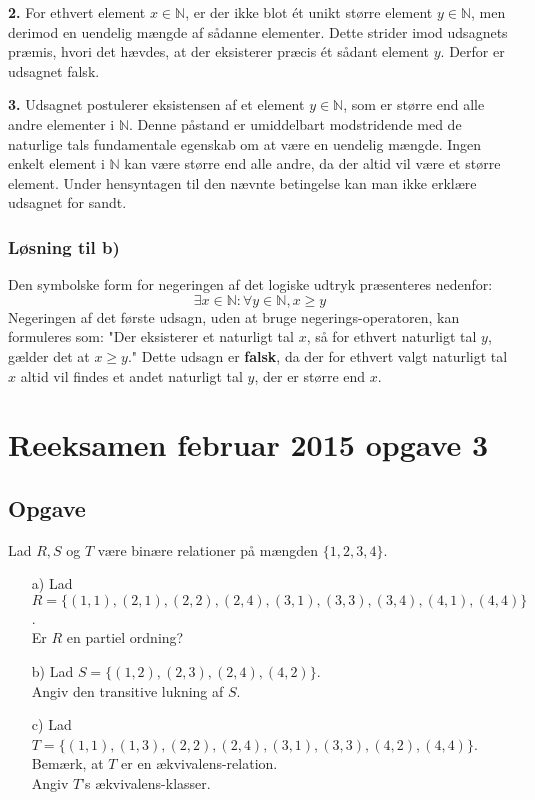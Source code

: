 \documentclass[12pt]{article}
\begin{document}
\vspace{0.25in}

\textbf{2.} For ethvert element \(x \in \mathbb{N}\), er der ikke blot ét unikt større element \(y \in \mathbb{N}\), men derimod en uendelig mængde af sådanne elementer. Dette strider imod udsagnets præmis, hvori det hævdes, at der eksisterer præcis ét sådant element \(y\). Derfor er udsagnet falsk.

\vspace{0.25in}

\textbf{3.} Udsagnet postulerer eksistensen af et element \(y \in \mathbb{N}\), som er større end alle andre elementer i \(\mathbb{N}\). Denne påstand er umiddelbart modstridende med de naturlige tals fundamentale egenskab om at være en uendelig mængde. Ingen enkelt element i \(\mathbb{N}\) kan være større end alle andre, da der altid vil være et større element. Under hensyntagen til den nævnte betingelse kan man ikke erklære udsagnet for sandt.


\subsubsection{Løsning til b)}
Den symbolske form for negeringen af det logiske udtryk præsenteres nedenfor:
\[
\exists x \in \mathbb{N} : \forall y \in \mathbb{N}, x \geq y
\]
Negeringen af det første udsagn, uden at bruge negerings-operatoren, kan formuleres som: "Der eksisterer et naturligt tal \(x\), så for ethvert naturligt tal \(y\), gælder det at \(x \geq y\)." Dette udsagn er \textbf{falsk}, da der for ethvert valgt naturligt tal \(x\) altid vil findes et andet naturligt tal \(y\), der er større end \(x\).


\section{Reeksamen februar 2015 opgave 3}
\subsection{Opgave}
Lad \( R, S \) og \( T \) være binære relationer på mængden \( \{1,2,3,4\} \).

\begin{itemize}
  \item[a)] Lad \( R = \{(1,1), (2,1), (2,2), (2,4), (3,1), (3,3), (3,4), (4,1), (4,4)\} \). \\ Er \( R \) en partiel ordning?
  \item[b)] Lad \( S = \{(1,2), (2,3), (2,4), (4,2)\} \). \\ Angiv den transitive lukning af \( S \).
  \item[c)] Lad \( T = \{(1,1), (1,3), (2,2), (2,4), (3,1), (3,3), (4,2), (4,4)\} \). \\ Bemærk, at \( T \) er en ækvivalens-relation.\\ Angiv \( T \)'s ækvivalens-klasser.
\end{itemize}
\end{document}
